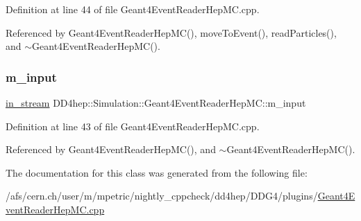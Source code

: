 Definition at line 44 of file Geant4\+Event\+Reader\+Hep\+M\+C.\+cpp.



Referenced by Geant4\+Event\+Reader\+Hep\+M\+C(), move\+To\+Event(), read\+Particles(), and $\sim$\+Geant4\+Event\+Reader\+Hep\+M\+C().

\hypertarget{class_d_d4hep_1_1_simulation_1_1_geant4_event_reader_hep_m_c_ab5768f9462667c171c87dbb0ce830e36}{}\label{class_d_d4hep_1_1_simulation_1_1_geant4_event_reader_hep_m_c_ab5768f9462667c171c87dbb0ce830e36} 
\subsubsection{\texorpdfstring{m\+\_\+input}{m\_input}}
{\footnotesize\ttfamily \hyperlink{class_d_d4hep_1_1_simulation_1_1_geant4_event_reader_hep_m_c_a1a456562e141e47288810fb708fa3815}{in\+\_\+stream} D\+D4hep\+::\+Simulation\+::\+Geant4\+Event\+Reader\+Hep\+M\+C\+::m\+\_\+input\hspace{0.3cm}{\ttfamily [protected]}}



Definition at line 43 of file Geant4\+Event\+Reader\+Hep\+M\+C.\+cpp.



Referenced by Geant4\+Event\+Reader\+Hep\+M\+C(), and $\sim$\+Geant4\+Event\+Reader\+Hep\+M\+C().



The documentation for this class was generated from the following file\+:\begin{DoxyCompactItemize}
\item 
/afs/cern.\+ch/user/m/mpetric/nightly\+\_\+cppcheck/dd4hep/\+D\+D\+G4/plugins/\hyperlink{_geant4_event_reader_hep_m_c_8cpp}{Geant4\+Event\+Reader\+Hep\+M\+C.\+cpp}\end{DoxyCompactItemize}
